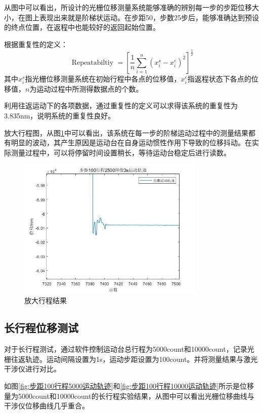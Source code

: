 \documentclass[type=master,oneside]{fduthesis}
\begin{document}
从图中可以看出，所设计的光栅位移测量系统能够准确的辨别每一步的步距位移大小，在图上表现出来就是阶梯状运动。在步距50，步数25步后，能够准确达到预设的终点位置，在返程中也能较好的返回起始位置。

根据重复性\cite{chassagne20072d}的定义：
\begin{equation}
  \text { Repeatabiltiy }=\left[\frac{1}{n} \sum_{i=1}^{n}\left(x_{i}^{s}-x_{i}^{e}\right)^{2}\right]^{\frac{1}{2}}
\end{equation}
其中$x_{i}^{s}$指光栅位移测量系统在初始行程中各点的位移值，$x_{i}^{e}$指返程状态下各点的位移值，$n$为运动过程中所测得数据点的个数。

利用往返运动下的各项数据，通过重复性的定义可以求得该系统的重复性为3.835nm，说明系统的重复性良好。

放大行程图，从图\ref{fig:放大行程结果}中可以看出，该系统在每一步的阶梯运动过程中的测量结果都有明显的波动，其产生原因是运动台在自身运动惯性作用下导致的位移抖动。在实际测量过程中，可以将停留时间设置稍长，等待运动台稳定后进行读数。
\begin{figure}[H]
  \centering
  \includegraphics[width=0.8\textwidth]{4-fig//放大行程结果.jpg}
  \caption{放大行程结果}
  \label{fig:放大行程结果}
\end{figure}

\subsection{长行程位移测试}
对于长行程测试，通过软件控制运动台总行程为5000count和10000count，记录光栅往返轨迹。运动间隔设置为1s，运动步距设置为100count。并将测量结果与激光干涉仪进行对比。

如图\ref{fig:步距100行程5000运动轨迹}和\ref{fig:步距100行程10000运动轨迹}所示是位移量为5000count和10000count的长行程实验结果，从图中可以看出光栅位移曲线与干涉仪位移曲线几乎重合。
\end{document}
